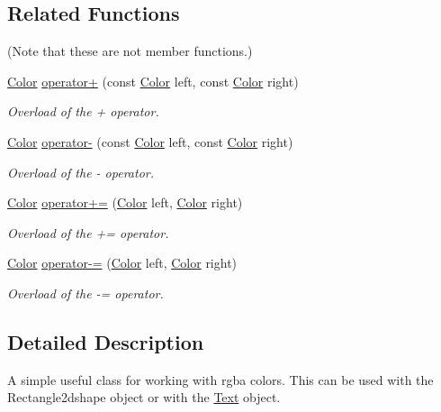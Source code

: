 \subsection*{Related Functions}
(Note that these are not member functions.) \begin{DoxyCompactItemize}
\item 
\hyperlink{classjetfuel_1_1draw_1_1Color}{Color} \hyperlink{classjetfuel_1_1draw_1_1Color_ab6396e36884cc40f26e35f2ef17ce38b}{operator+} (const \hyperlink{classjetfuel_1_1draw_1_1Color}{Color} left, const \hyperlink{classjetfuel_1_1draw_1_1Color}{Color} right)
\begin{DoxyCompactList}\small\item\em Overload of the + operator. \end{DoxyCompactList}\item 
\hyperlink{classjetfuel_1_1draw_1_1Color}{Color} \hyperlink{classjetfuel_1_1draw_1_1Color_aa6992ba7435232c7cd36cce08531f343}{operator-\/} (const \hyperlink{classjetfuel_1_1draw_1_1Color}{Color} left, const \hyperlink{classjetfuel_1_1draw_1_1Color}{Color} right)
\begin{DoxyCompactList}\small\item\em Overload of the -\/ operator. \end{DoxyCompactList}\item 
\hyperlink{classjetfuel_1_1draw_1_1Color}{Color} \hyperlink{classjetfuel_1_1draw_1_1Color_a226f4b8ca4054f4cb338e7c33bbc71c5}{operator+=} (\hyperlink{classjetfuel_1_1draw_1_1Color}{Color} left, \hyperlink{classjetfuel_1_1draw_1_1Color}{Color} right)
\begin{DoxyCompactList}\small\item\em Overload of the += operator. \end{DoxyCompactList}\item 
\hyperlink{classjetfuel_1_1draw_1_1Color}{Color} \hyperlink{classjetfuel_1_1draw_1_1Color_aad218c71ae58d4895e18fb6cd109d91f}{operator-\/=} (\hyperlink{classjetfuel_1_1draw_1_1Color}{Color} left, \hyperlink{classjetfuel_1_1draw_1_1Color}{Color} right)
\begin{DoxyCompactList}\small\item\em Overload of the -\/= operator. \end{DoxyCompactList}\end{DoxyCompactItemize}


\subsection{Detailed Description}
A simple useful class for working with rgba colors. This can be used with the Rectangle2dshape object or with the \hyperlink{classjetfuel_1_1draw_1_1Text}{Text} object.

